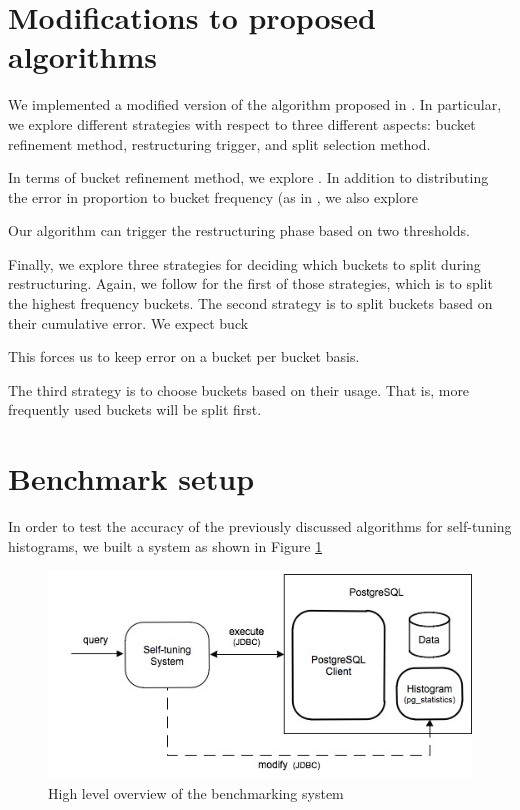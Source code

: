 \documentclass[twocolumn]{article}
\begin{document}
\section{Modifications to proposed algorithms}\label{our-work}

We implemented a modified version of the algorithm proposed in \cite{Aboulnaga-99}. In particular, we explore
different strategies with respect to three different aspects: bucket refinement method, restructuring trigger, and
split selection method.

In terms of bucket refinement method, we explore . In addition to distributing the error in proportion to bucket frequency (as in \cite{Aboulnaga-99}, we also explore 

Our algorithm can trigger the restructuring phase based on two thresholds. 

Finally, we explore three strategies for deciding which buckets to split during restructuring. Again, we follow
\cite{Aboulnaga-99} for the first of those strategies, which is to split the highest frequency buckets. The second
strategy is to split buckets based on their cumulative error. We expect buck

This forces us to keep error on a bucket per bucket basis.

The third strategy is to choose buckets based on their usage. That is, more frequently used buckets will be split first.

\section{Benchmark setup}\label{benchmark}


In order to test the accuracy of the previously discussed algorithms for self-tuning histograms, we built a system as shown in Figure \ref{pwngres-system} 

\begin{figure}
\begin{center}
	\label{pwngres-system}

	\includegraphics[width=0.8\columnwidth]{systemDiagram.JPEG}
	\caption{High level overview of the benchmarking system}	
\end{center}
\end{figure}
\end{document}
